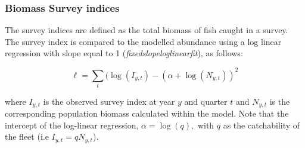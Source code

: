 \documentclass[review]{elsarticle}
\begin{document}
%  
%  
% 


\subsubsection*{Biomass Survey indices}

The survey indices are defined as the total biomass of fish caught in a survey. The survey index is compared to the modelled abundance using a log linear regression with slope  equal to 1  (\textit{fixedslopeloglinearfit}), as follows:

\begin{equation}
\label{eq:surind}
\ell=\sum\limits_t (\log(I_{y,t}) - (\alpha+\log(N_{y,t}))^2
\end{equation}

where $ I_{y,t}$ is the observed survey index at year $y$ and quarter $t$ and $ N_{y,t}$ is the corresponding population biomass calculated within the model. Note that the intercept of the log-linear regression, $\alpha=\log (q),$ with $q$ as the catchability of the fleet (i.e $I_{y,t}=q N_{y,t}$).
\end{document}
